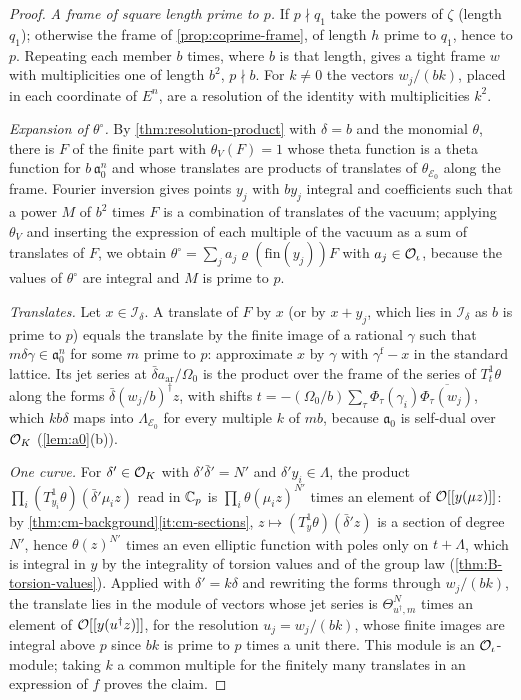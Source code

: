 \begin{proof}
\emph{A frame of square length prime to $p$.} If $p\nmid q_1$ take the powers of $\zeta$ (length $q_1$);
otherwise the frame of \cref{prop:coprime-frame}, of length $h$ prime to $q_1$, hence to $p$. Repeating
each member $b$ times, where $b$ is that length, gives a tight frame $w$ with multiplicities one of
length $b^2$, $p\nmid b$. For $k\ne0$ the vectors $w_j/(bk)$, placed in each coordinate of $E^n$, are a
resolution of the identity with multiplicities $k^2$.

\emph{Expansion of $\theta^\circ$.} By \cref{thm:resolution-product} with $\delta=b$ and the monomial
$\theta$, there is $F$ of the finite part with $\theta_V(F)=1$ whose theta function is a theta function
for $b\,\mathfrak a_0^n$ and whose translates are products of translates of $\theta_{\mathcal E_0}$ along
the frame. Fourier inversion gives points $y_j$ with $by_j$ integral and coefficients such that a power
$M$ of $b^2$ times $F$ is a combination of translates of the vacuum; applying $\theta_V$ and inserting
the expression of each multiple of the vacuum as a sum of translates of $F$, we obtain
$\theta^\circ=\sum_ja_j\varrho(\mathrm{fin}(y_j))F$ with $a_j\in\mathcal{O}_\iota$, because the values of
$\theta^\circ$ are integral and $M$ is prime to $p$.

\emph{Translates.} Let $x\in\mathcal I_\delta$. A translate of $F$ by $x$ (or by $x+y_j$, which lies in
$\mathcal I_\delta$ as $b$ is prime to $p$) equals the translate by the finite image of a rational
$\gamma$ such that $m\delta\gamma\in\mathfrak a_0^n$ for some $m$ prime to $p$: approximate $x$ by $\gamma$
with $\gamma^{\mathrm f}-x$ in the standard lattice. Its jet series at $\bar\delta a_{\mathrm{ar}}/\Omega_0$ is
the product over the frame of the series of $T^1_{t}\theta$ along the forms $\bar\delta(w_j/b)^\dagger z$,
with shifts $t=-(\Omega_0/b)\sum_\tau\Phi_\tau(\gamma_i)\overline{\Phi_\tau(w_j)}$, which $kb\delta$ maps into
$\Lambda_{\mathcal E_0}$ for every multiple $k$ of $mb$, because $\mathfrak a_0$ is self-dual over $\mathcal{O}_K$
(\cref{lem:a0}(b)).

\emph{One curve.} For $\delta'\in\mathcal{O}_K$ with $\delta'\bar\delta'=N'$ and $\delta'y_i\in\Lambda$, the product
$\prod_i(T^1_{y_i}\theta)(\bar\delta'\mu_iz)$ read in $\mathbb{C}_p$ is $\prod_i\theta(\mu_iz)^{N'}$ times an element
of $\mathcal{O}[[y(\mu z)]]$: by \cref{thm:cm-background}\ref{it:cm-sections}, $z\mapsto(T^1_{y}\theta)(\bar\delta'z)$ is
a section of degree $N'$, hence $\theta(z)^{N'}$ times an even elliptic function with poles only on
$t+\Lambda$, which is integral in $y$ by the integrality of torsion values and of the group law
(\cref{thm:B-torsion-values}). Applied with $\delta'=k\delta$ and rewriting the forms through
$w_j/(bk)$, the translate lies in the module of vectors whose jet series is
$\Theta_{u^\dagger,m}^N$ times an element of $\mathcal{O}[[y(u^\dagger z)]]$, for the resolution $u_j=w_j/(bk)$,
whose finite images are integral above $p$ since $bk$ is prime to $p$ times a unit there. This module
is an $\mathcal{O}_\iota$-module; taking $k$ a common multiple for the finitely many translates in an expression
of $f$ proves the claim.
\end{proof}

